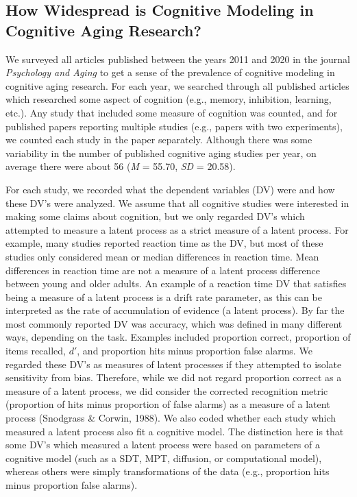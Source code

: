 \documentclass[
  english,
  ,man,floatsintext]{apa6}
\begin{document}
\hypertarget{how-widespread-is-cognitive-modeling-in-cognitive-aging-research}{%
\subsection{How Widespread is Cognitive Modeling in Cognitive Aging Research?}\label{how-widespread-is-cognitive-modeling-in-cognitive-aging-research}}

We surveyed all articles published between the years 2011 and 2020 in the journal \emph{Psychology and Aging} to get a sense of the prevalence of cognitive modeling in cognitive aging research. For each year, we searched through all published articles which researched some aspect of cognition (e.g., memory, inhibition, learning, etc.). Any study that included some measure of cognition was counted, and for published papers reporting multiple studies (e.g., papers with two experiments), we counted each study in the paper separately. Although there was some variability in the number of published cognitive aging studies per year, on average there were about 56 (\emph{M} = 55.70, \emph{SD} = 20.58).

For each study, we recorded what the dependent variables (DV) were and how these DV's were analyzed. We assume that all cognitive studies were interested in making some claims about cognition, but we only regarded DV's which attempted to measure a latent process as a strict measure of a latent process. For example, many studies reported reaction time as the DV, but most of these studies only considered mean or median differences in reaction time. Mean differences in reaction time are not a measure of a latent process difference between young and older adults. An example of a reaction time DV that satisfies being a measure of a latent process is a drift rate parameter, as this can be interpreted as the rate of accumulation of evidence (a latent process). By far the most commonly reported DV was accuracy, which was defined in many different ways, depending on the task. Examples included proportion correct, proportion of items recalled, \(d'\), and proportion hits minus proportion false alarms. We regarded these DV's as measures of latent processes if they attempted to isolate sensitivity from bias. Therefore, while we did not regard proportion correct as a measure of a latent process, we did consider the corrected recognition metric (proportion of hits minus proportion of false alarms) as a measure of a latent process (Snodgrass \& Corwin, 1988). We also coded whether each study which measured a latent process also fit a cognitive model. The distinction here is that some DV's which measured a latent process were based on parameters of a cognitive model (such as a SDT, MPT, diffusion, or computational model), whereas others were simply transformations of the data (e.g., proportion hits minus proportion false alarms).
\end{document}
